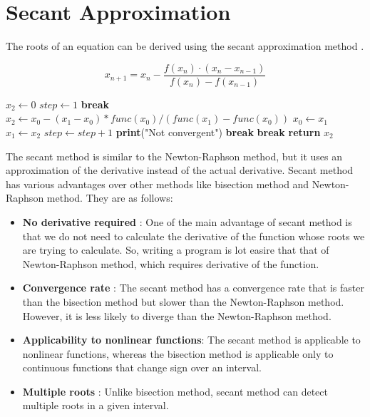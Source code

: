 \documentclass{report}
\begin{document}
\section{Secant Approximation}
\begin{flushleft}
The roots of an equation can be derived using the secant approximation method \cite{Wikipedia:SecantMethod}.
\end{flushleft}
$$ x_{n+1} = x_n - \frac{f(x_n) \cdot (x_n - x_{n-1})}{f(x_n) - f(x_{n-1})} $$
\begin{algorithmic}[1]
    \State $x_2 \gets 0$
    \State $step \gets 1$
            \State \textbf{break}
        \EndIf
        \State $x_2 \gets x_0 - (x_1 - x_0) * func(x_0) / (func(x_1) - func(x_0))$
        \State $x_0 \gets x_1$
        \State $x_1 \gets x_2$
        \State $step \gets step + 1$
            \State \textbf{print}("Not convergent")
            \State \textbf{break}
        \EndIf
            \State \textbf{break}
        \EndIf
    \EndWhile
    \State \textbf{return} $x_2$
\EndFunction
\end{algorithmic}
\begin{flushleft}
  The secant method is similar to the Newton-Raphson method, but it uses an approximation of the derivative instead of the actual derivative. Secant method has various advantages over other methods like bisection method and Newton-Raphson method. They are as follows:
  \begin{itemize}
    \item \textbf{No derivative required} : One of the main advantage of secant method is that we do not need to calculate the derivative of the function whose roots we are trying to calculate. So, writing a program is lot easire that that of Newton-Raphson method, which requires derivative of the function.
    \item \textbf{Convergence rate} : The secant method has a convergence rate that is faster than the bisection method but slower than the Newton-Raphson method. However, it is less likely to diverge than the Newton-Raphson method.
    \item \textbf{Applicability to nonlinear functions}: The secant method is applicable to nonlinear functions, whereas the bisection method is applicable only to continuous functions that change sign over an interval.
    \item \textbf{Multiple roots} : Unlike bisection method, secant method can detect multiple roots in a given interval.
  \end{itemize}
\end{flushleft}
\end{document}
